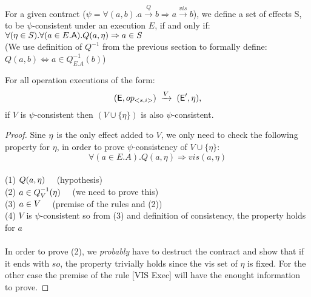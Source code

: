 \begin{definition}
For a given contract ($\psi=\forall(a,b). a
\xrightarrow{Q} b \Rightarrow a \xrightarrow{vis} b $), we define a set
of effects S, to be  $\psi$-consistent under an execution $E$, if and
only if: 
$\forall (\eta \in S). \forall(a\in E.{\normalfont \textsf{A}}). Q(a,\eta)
\Rightarrow a \in S$ 
\\(We use definition of $Q^{-1}$ from the previous section to formally
define: $Q(a,b) \iff a \in Q_{E.A}^{-1}(b)  $)
\end{definition}

\begin{theorem}
For all operation executions of the form: 
$$
({\normalfont \textsf{E}},op_{<s,i>}) 
    \;\xrightarrow{V}\;
  ({\normalfont \textsf{E}}',\eta) 
,$$ 
if $V$ is $\psi$-consistent then $(V\cup\{\eta\})$ is also
$\psi$-consistent.
\end{theorem}
\begin{proof}
Sine $\eta$ is the only effect added to $V$, we only need to check the
following property for $\eta$, in order to prove $\psi$-consistency of
$V\cup\{\eta\}$:
$$\forall (a \in E.A). Q(a,\eta) \Rightarrow vis(a,\eta)  $$
\\
(1) $Q(a,\eta) \quad$ (hypothesis)
\\(2) $a \in Q^{-1}_V (\eta) \quad$  (we need to prove this)
\\(3) $a \in V \quad$ (premise of the rules and (2))
\\(4) $V$ is $\psi$-consistent so from (3) and definition of
consistency, the property holds for $a$
\paragraph{} In order to prove (2), we \emph{probably} have to destruct the contract and
show that if it ends with $so$, the property trivially holds since the
vis set of $\eta$ is fixed. For the other case the premise of the rule
[VIS Exec] will have the enought information to prove.
\end{proof}
\newpage
